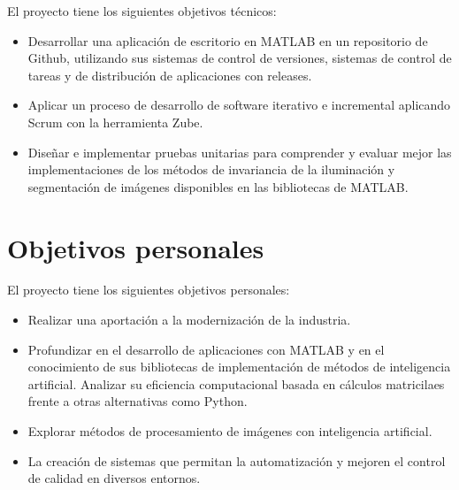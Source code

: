 El proyecto tiene los siguientes objetivos técnicos:

\begin{itemize}
    \tightlist
        \item
            Desarrollar una aplicación de escritorio en MATLAB en un repositorio de Github, utilizando sus sistemas de control de versiones, sistemas de control de tareas y de distribución de  aplicaciones con releases.
        \item
            Aplicar un proceso de desarrollo de software iterativo e incremental aplicando Scrum con la herramienta Zube.
        \item
            Diseñar e implementar pruebas unitarias para comprender y evaluar mejor las implementaciones de los métodos de invariancia de la iluminación y segmentación de imágenes disponibles en las bibliotecas de MATLAB.
\end{itemize}

\section{Objetivos personales}\label{objetivos-personales}

El proyecto tiene los siguientes objetivos personales:

\begin{itemize}
    \tightlist
        \item
            Realizar una aportación a la modernización de la industria.
        \item
            Profundizar en el desarrollo de aplicaciones con MATLAB y en el conocimiento de sus bibliotecas de implementación de métodos de inteligencia artificial. Analizar su eficiencia computacional basada en cálculos matricilaes frente a otras alternativas como Python.
        \item
            Explorar métodos de procesamiento de imágenes con inteligencia artificial.
        \item 
            La creación de sistemas que permitan la automatización y mejoren el control de calidad en diversos entornos.
\end{itemize}